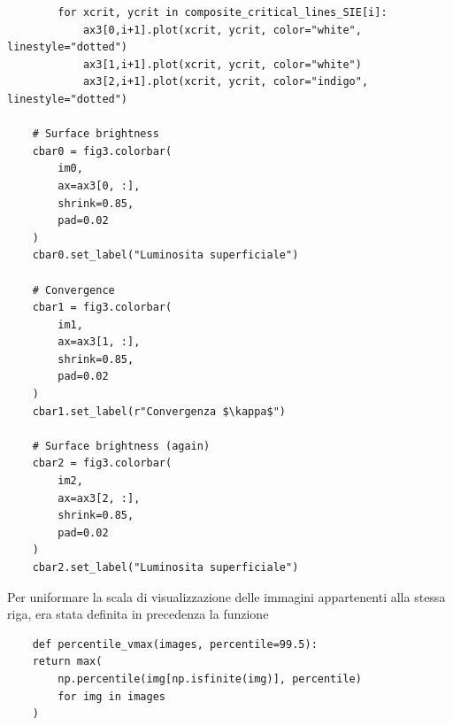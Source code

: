 \begin{lstlisting}
        for xcrit, ycrit in composite_critical_lines_SIE[i]:
            ax3[0,i+1].plot(xcrit, ycrit, color="white", linestyle="dotted")
            ax3[1,i+1].plot(xcrit, ycrit, color="white")
            ax3[2,i+1].plot(xcrit, ycrit, color="indigo", linestyle="dotted")
    
    # Surface brightness
    cbar0 = fig3.colorbar(
        im0,
        ax=ax3[0, :],
        shrink=0.85,
        pad=0.02
    )
    cbar0.set_label("Luminosita superficiale")
    
    # Convergence
    cbar1 = fig3.colorbar(
        im1,
        ax=ax3[1, :],
        shrink=0.85,
        pad=0.02
    )
    cbar1.set_label(r"Convergenza $\kappa$")
    
    # Surface brightness (again)
    cbar2 = fig3.colorbar(
        im2,
        ax=ax3[2, :],
        shrink=0.85,
        pad=0.02
    )
    cbar2.set_label("Luminosita superficiale")
\end{lstlisting}
Per uniformare la scala di visualizzazione delle immagini appartenenti alla stessa riga, era stata  definita in precedenza la funzione
\begin{lstlisting}
    def percentile_vmax(images, percentile=99.5):
    return max(
        np.percentile(img[np.isfinite(img)], percentile)
        for img in images
    )
\end{lstlisting}

